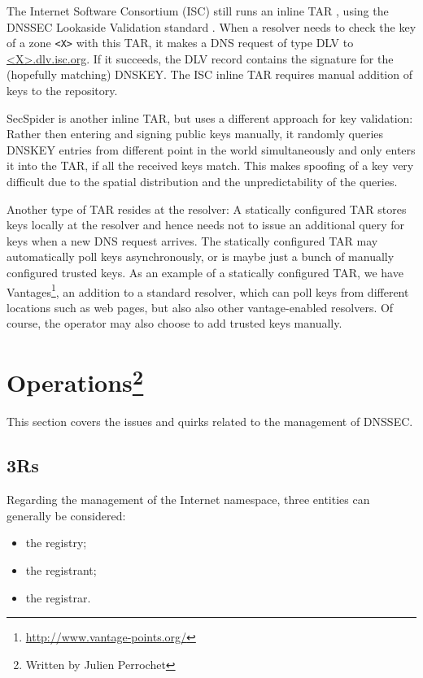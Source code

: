 \documentclass[a4paper,twocolumn]{scrartcl}
\newcommand{\wbjp}{\protect\footnote{Written by Julien Perrochet}}
\begin{document}
The Internet Software Consortium (ISC) still runs an inline TAR
\cite{iscDlv}, using the DNSSEC Lookaside Validation standard
\cite{RFC5074}. When a resolver needs to check the key of a zone
\verb|<X>| with this TAR, it makes a DNS request of type DLV to 
\url{<X>.dlv.isc.org}. If it succeeds, the DLV record contains the
signature for the (hopefully matching) DNSKEY. The ISC inline TAR
requires manual addition of keys to the repository.

SecSpider \cite{secspider, Osterweil09} is another inline TAR, but
uses a different approach for key validation: Rather then entering and
signing public keys manually, it randomly queries DNSKEY entries from
different point in the world simultaneously and only enters it into
the TAR, if all the received keys match. This makes spoofing of a key
very difficult due to the spatial distribution and the
unpredictability of the queries.

Another type of TAR resides at the resolver: A statically configured
TAR stores keys locally at the resolver and hence needs not to issue an
additional query for keys when a new DNS request arrives. The
statically configured TAR may automatically poll keys asynchronously,
or is maybe just a bunch of manually configured trusted keys. As an
example of a statically configured TAR, we have
Vantages\footnote{\url{http://www.vantage-points.org/}}, an addition
to a standard resolver, \cite{Osterweil09} which can poll keys from
different locations such as web pages, but also also other
vantage-enabled resolvers. Of course, the operator may also choose to
add trusted keys manually.

\section{Operations\wbjp}
This section covers the issues and quirks related to the management of DNSSEC.
\subsection{3Rs}
Regarding the management of the Internet namespace, three entities can generally be considered:

\begin{itemize}
\item the registry;
\item the registrant;
\item the registrar.
\end{itemize}
\end{document}
